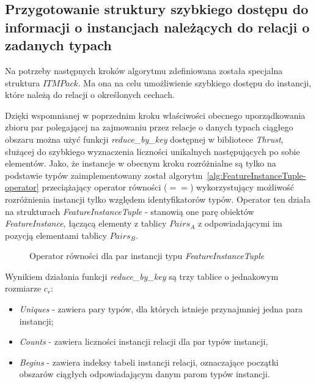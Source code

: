 \documentclass[12pt]{article}
\begin{document}
\subsection{Przygotowanie struktury szybkiego dostępu do informacji o instancjach należących do relacji o zadanych typach}

Na potrzeby następnych kroków algorytmu zdefiniowana została specjalna struktura $ ITMPack $. Ma ona na celu umożliwienie szybkiego dostępu do instancji, które należą do relacji o określonych cechach. 

Dzięki wspomnianej w poprzednim kroku właściwości obecnego uporządkowania zbioru par polegającej na zajmowaniu przez relacje o danych typach ciągłego obszaru można użyć funkcji \textit{reduce\_by\_key} dostępnej w bibliotece \textit{Thrust}, służącej do szybkiego wyznaczenia liczności unikalnych następujących po sobie elementów. Jako, że instancje w obecnym kroku rozróżnialne są tylko na podstawie typów zaimplementowany został algorytm~\ref{alg:FeatureInstanceTuple-operator} przeciążający operator równości ($ == $) wykorzystujący możliwość rozróżnienia instancji tylko względem identyfikatorów typów. Operator ten działa na strukturach \textit{FeatureInstanceTuple} - stanowią one parę obiektów \textit{FeatureInstance}, łączącą elementy z tablicy $ Pairs_{A} $ z odpowiadającymi im pozycją elementami tablicy $ Pairs_{B} $.

\begin{figure}[H]
\begin{algorithm}[H]
\caption{Operator równości dla par instancji typu \textit{FeatureInstanceTuple}}
\label{alg:FeatureInstanceTuple_operator}
\end{algorithm}
\end{figure}

Wynikiem działania funkcji \textit{reduce\_by\_key} są trzy tablice o jednakowym rozmiarze $ c_{r} $:
\begin{itemize}
\item \textit{Uniques} - zawiera pary typów, dla których istnieje przynajmniej jedna para instancji;
\item \textit{Counts} - zawiera liczności instancji relacji dla par typów instancji,
\item \textit{Begins} - zawiera indeksy tabeli instancji relacji, oznaczające początki obszarów ciągłych odpowiadającym danym parom typów instancji.
\end{itemize}
\end{document}
